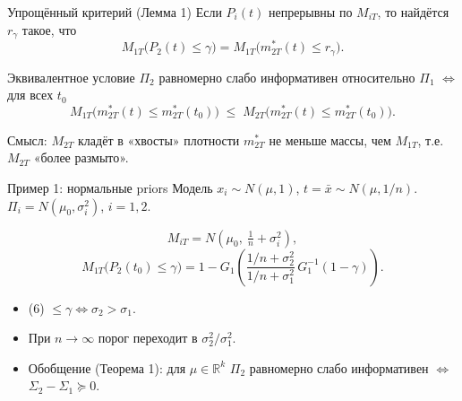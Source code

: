 \documentclass[aspectratio=169,10pt]{beamer}
\begin{document}
\begin{frame}{Упрощённый критерий (Лемма 1)}
  Если $P_i(t)$ непрерывны по $M_{iT}$, то найдётся $r_\gamma$ такое, что
  \[
    M_{1T}\bigl(P_2(t)\le \gamma\bigr) = M_{1T}\bigl(m_{2T}^*(t)\le r_\gamma\bigr).
  \]

  \begin{block}{Эквивалентное условие}
    $\Pi_2$ равномерно слабо информативен относительно $\Pi_1$
    $\iff$
    для всех $t_0$
    \[
      M_{1T}\bigl(m_{2T}^*(t)\le m_{2T}^*(t_0)\bigr)
      \;\le\;
      M_{2T}\bigl(m_{2T}^*(t)\le m_{2T}^*(t_0)\bigr).
    \]
  \end{block}

  \alert{Смысл:} $M_{2T}$ кладёт в «хвосты» плотности $m_{2T}^*$
  не меньше массы, чем $M_{1T}$, т.е. $M_{2T}$ «более размыто».
\end{frame}

\begin{frame}{Пример 1: нормальные priors}
  Модель $x_i\sim N(\mu,1)$, $t=\bar x\sim N(\mu,1/n)$.
  $\Pi_i = N(\mu_0,\sigma_i^2)$, $i=1,2$.

  \[
    M_{iT} = N\!\left(\mu_0,\ \tfrac{1}{n}+\sigma_i^2\right),
  \]
  \[
    M_{1T}\bigl(P_2(t_0)\le \gamma\bigr)
      = 1 - G_1\!\left(
        \frac{1/n+\sigma_2^2}{1/n+\sigma_1^2}\,
        G_1^{-1}(1-\gamma)
      \right).
    \tag{6}
  \]
  \begin{itemize}
    \item (6) $\le\gamma \iff \sigma_2 > \sigma_1$.
    \item При $n\to\infty$ порог переходит в $\sigma_2^2/\sigma_1^2$.
    \item \alert{Обобщение (Теорема 1):} для $\mu\in\mathbb R^k$
          $\Pi_2$ равномерно слабо информативен $\iff$
          $\Sigma_2-\Sigma_1 \succeq 0$.
  \end{itemize}
\end{frame}
\end{document}
